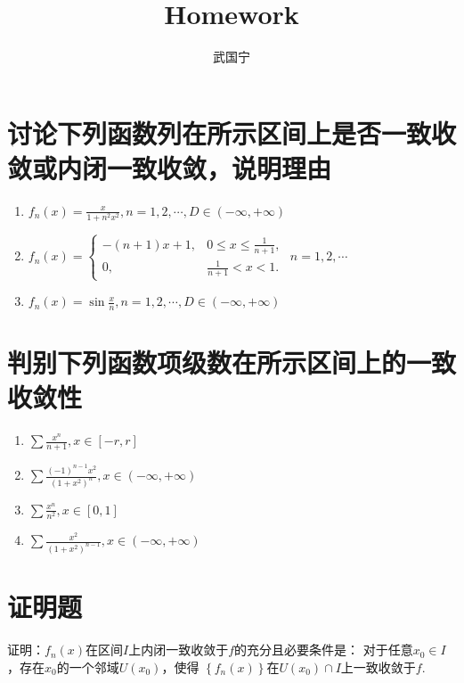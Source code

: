 \documentclass[a4paper,12pt]{article}
\begin{document}
\title{Homework}
\author{武国宁}
\date{}
\maketitle

\section{讨论下列函数列在所示区间上是否一致收敛或内闭一致收敛，说明理由}
\begin{enumerate}[label={\rm(\arabic*)}]
    \item $\displaystyle f_n(x) = \frac{x}{1 + n^2x^2}, n = 1,2, \cdots, D \in (-\infty, +\infty)$
    \item $\displaystyle f_n(x) = \left\{\begin{array}{cl} 
             -(n+1)x+1, & 0 \le x \le \frac{1}{n+1}, \\
             0        , & \frac{1}{n+1} < x <1. 
            \end{array} \right.$
          $\displaystyle n = 1,2, \cdots$
      \item $\displaystyle f_n(x) = \sin \frac{x}{n}, n = 1, 2, \cdots,
          D \in \left(-\infty, +\infty\right)$
\end{enumerate}

\section{判别下列函数项级数在所示区间上的一致收敛性}
\begin{enumerate}[label={\rm(\arabic*)}]
    \item $\displaystyle \sum \frac{x^n}{n+1}, x \in [-r, r]$
    \item $\displaystyle \sum \frac{(-1)^{n-1}x^2}{(1+x^2)^n}, x \in 
        \left(-\infty, +\infty\right)$
    \item $\displaystyle \sum \frac{x^n}{n^2}, x \in [0,1]$
    \item $\displaystyle \sum \frac{x^2}{(1+x^2)^{n-1}}, x \in 
        \left(-\infty, +\infty\right)$
\end{enumerate}
\section{证明题}
证明：$\displaystyle f_n(x)$在区间$I$上内闭一致收敛于$f$的充分且必要条件是：
对于任意$x_0 \in I$，存在$x_0$的一个邻域$\displaystyle U(x_0)$，使得
$\displaystyle \left\{f_n(x)\right\}$在$\displaystyle U(x_0) \cap I$上一致收敛于$f$.
\end{document}
